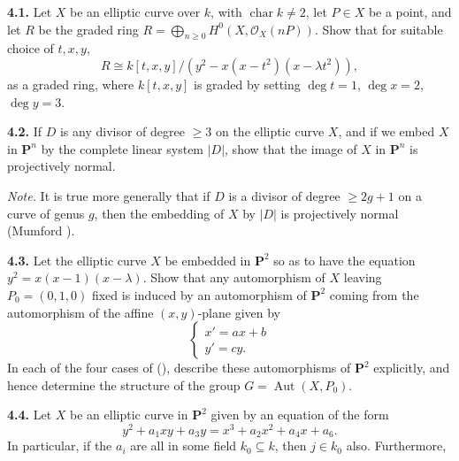 {\smallskip
\noindent\hypertarget{ex-IV-4.1}{}\textbf{4.1.} Let $X$ be an elliptic curve over $k$, with $\operatorname{char}k\ne2$, let $P\in X$ be a point, and let $R$ be the graded ring $R=\bigoplus_{n\ge0}H^0(X,\mathcal O_X(nP))$. Show that for suitable choice of $t,x,y$,
\[
R\cong k[t,x,y]/(y^2-x(x-t^2)(x-\lambda t^2)),
\]
as a graded ring, where $k[t,x,y]$ is graded by setting $\deg t=1$, $\deg x=2$, $\deg y=3$.

\smallskip
\noindent\hypertarget{ex-IV-4.2}{}\textbf{4.2.} If $D$ is any divisor of degree $\ge3$ on the elliptic curve $X$, and if we embed $X$ in $\mathbf P^n$ by the complete linear system $|D|$, show that the image of $X$ in $\mathbf P^n$ is projectively normal.

\emph{Note.} It is true more generally that if $D$ is a divisor of degree $\ge2g+1$ on a curve of genus $g$, then the embedding of $X$ by $|D|$ is projectively normal (Mumford ).

\smallskip
\noindent\hypertarget{ex-IV-4.3}{}\textbf{4.3.} Let the elliptic curve $X$ be embedded in $\mathbf P^2$ so as to have the equation $y^2=x(x-1)(x-\lambda)$. Show that any automorphism of $X$ leaving $P_0=(0,1,0)$ fixed is induced by an automorphism of $\mathbf P^2$ coming from the automorphism of the affine $(x,y)$-plane given by
\[
\begin{cases}
x'=ax+b\\
y'=cy.
\end{cases}
\]
In each of the four cases of (), describe these automorphisms of $\mathbf P^2$ explicitly, and hence determine the structure of the group $G=\operatorname{Aut}(X,P_0)$.

\smallskip
\noindent\hypertarget{ex-IV-4.4}{}\textbf{4.4.} Let $X$ be an elliptic curve in $\mathbf P^2$ given by an equation of the form
\[
y^2+a_1xy+a_3y=x^3+a_2x^2+a_4x+a_6.
\]
 In particular, if the $a_i$ are all in some field $k_0\subseteq k$, then $j\in k_0$ also. Furthermore,}
